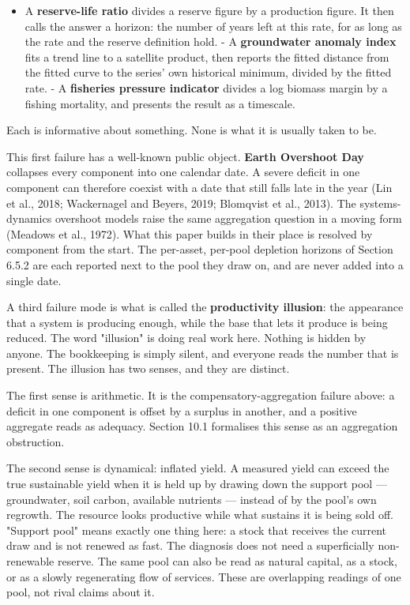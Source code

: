 \documentclass[11pt]{article}
\begin{document}
\begin{itemize}\setlength{\itemsep}{2pt}
\item A \textbf{reserve-life ratio} divides a reserve figure by a production figure. It then calls the answer a horizon: the number of years left at this rate, for as long as the rate and the reserve definition hold. - A \textbf{groundwater anomaly index} fits a trend line to a satellite product, then reports the fitted distance from the fitted curve to the series' own historical minimum, divided by the fitted rate. - A \textbf{fisheries pressure indicator} divides a log biomass margin by a fishing mortality, and presents the result as a timescale.
\end{itemize}

Each is informative about something. None is what it is usually taken to be.

This first failure has a well-known public object. \textbf{Earth Overshoot Day} collapses every component into one calendar date. A severe deficit in one component can therefore coexist with a date that still falls late in the year (Lin et al., 2018; Wackernagel and Beyers, 2019; Blomqvist et al., 2013). The systems-dynamics overshoot models raise the same aggregation question in a moving form (Meadows et al., 1972). What this paper builds in their place is resolved by component from the start. The per-asset, per-pool depletion horizons of Section 6.5.2 are each reported next to the pool they draw on, and are never added into a single date.

A third failure mode is what is called the \textbf{productivity illusion}: the appearance that a system is producing enough, while the base that lets it produce is being reduced. The word "illusion" is doing real work here. Nothing is hidden by anyone. The bookkeeping is simply silent, and everyone reads the number that is present. The illusion has two senses, and they are distinct.

The first sense is arithmetic. It is the compensatory-aggregation failure above: a deficit in one component is offset by a surplus in another, and a positive aggregate reads as adequacy. Section 10.1 formalises this sense as an aggregation obstruction.

The second sense is dynamical: inflated yield. A measured yield can exceed the true sustainable yield when it is held up by drawing down the support pool --- groundwater, soil carbon, available nutrients --- instead of by the pool's own regrowth. The resource looks productive while what sustains it is being sold off. "Support pool" means exactly one thing here: a stock that receives the current draw and is not renewed as fast. The diagnosis does not need a superficially non-renewable reserve. The same pool can also be read as natural capital, as a stock, or as a slowly regenerating flow of services. These are overlapping readings of one pool, not rival claims about it.
\end{document}
